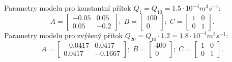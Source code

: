 \documentclass[a4paper,11pt]{article}
\begin{document}
Parametry modelu pro konstantní přítok $Q_{1}=Q_{10}=1.5\cdot 10^{-4}m^{3}s^{-1}$:
$$A =
\left [\begin{array}{cc}
-0.05  & 0.05 \\
0.05 & -0.2
\end{array}\right ];\;
B= 
\left [\begin{array}{cc}
400\\
0\end{array}\right ];\;
C=
\left [\begin{array}{cc}
1 & 0\\
0 & 1\end{array}\right ].
$$
Parametry modelu pro zvýšený přítok $Q_{20}=Q_{10}\cdot1.2=1.8\cdot 10^{-4}m^{3}s^{-1}$:
$$A =
\left [\begin{array}{cc}
-0.0417  & 0.0417 \\
0.0417 & -0.1667
\end{array}\right ];\;
B= 
\left [\begin{array}{cc}
400\\
0\end{array}\right ];\;
C=
\left [\begin{array}{cc}
1 & 0\\
0 & 1\end{array}\right ].
$$
\end{document}

